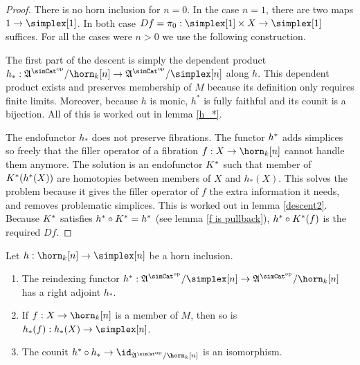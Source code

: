 \newcommand\hornInclusion[2]{h^{#1}_{#2}}

\begin{proof} There is no horn inclusion for $n=0$. In the case $n=1$, there are two maps $1\to\simplex[1]$. In both case $Df=\pi_0\of \simplex[1]\times X \to\simplex[1]$ suffices. For all the cases were $n>0$ we use the following construction.

The first part of the descent is simply the dependent product $h_*\of \ambient\s/\horn_k[n]\to \ambient\s/\simplex[n]$ along $h$. This dependent product exists and preserves membership of $M$ because its definition only requires finite limits. Moreover, because $h$ is monic, $h^*$ is fully faithful and its counit is a bijection. All of this is worked out in lemma \ref{h_*}. 

The endofunctor $h_*$ does not preserve fibrations. The functor $h^*$ adds simplices so freely that the filler operator of a fibration $f\of X\to \horn_k[n]$ cannot handle them anymore. The solution is an endofunctor $K^*$ such that member of $K^*(h^*(X))$ are homotopies between members of $X$ and $h_*(X)$. This solves the problem because it gives the filler operator of $f$ the extra information it needs, and removes problematic simplices. This is worked out in lemma \ref{descent2}. Because $K^*$ satisfies $h^*\circ K^* = h^*$ (see lemma \ref{f is pullback}), $h^*\circ K^*(f)$ is the required $Df$.
\end{proof}



\begin{lemma} Let $h\of \horn_k[n]\to \simplex[n]$ be a horn inclusion.
\begin{enumerate}
\item The reindexing functor $h\ri\of\ambient\s/\simplex[n]\to\ambient\s/\horn_k[n]$ has a right adjoint $h_*$.
\item If $f\of X\to \horn_k[n]$ is a member of $M$, then so is $h_*(f)\of h_*(X)\to \simplex[n]$.
\item The counit $h\ri\circ h_*\to\id_{\ambient\s/\horn_k[n]}$ is an isomorphism.
\end{enumerate}\label{h_*} 
\end{lemma}

